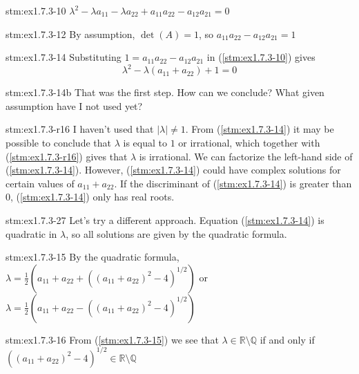 \begin{statement}{stm:ex1.7.3-10}
$\lambda^2 - \lambda a_{11} - \lambda a_{22} + a_{11}a_{22} - a_{12}a_{21} = 0$
\end{statement}

\begin{statement}{stm:ex1.7.3-12}
By assumption, $\det(A) = 1$, so $a_{11}a_{22} - a_{12}a_{21} = 1$
\end{statement}

\begin{statement}{stm:ex1.7.3-14}
Substituting $1 = a_{11}a_{22} - a_{12}a_{21}$ in (\ref{stm:ex1.7.3-10}) gives
$$\lambda^2 - \lambda(a_{11} + a_{22}) + 1 = 0$$
\end{statement}

\begin{explanation}{stm:ex1.7.3-14b}
That was the first step. How can we conclude? What given assumption have I not used yet?
\end{explanation}

\begin{explanation}{stm:ex1.7.3-r16}
I haven't used that $|\lambda| \ne 1$. From (\ref{stm:ex1.7.3-14}) it may be possible to conclude that $\lambda$ is equal to $1$ or irrational, which together with (\ref{stm:ex1.7.3-r16}) gives that $\lambda$ is irrational. We can factorize the left-hand side of (\ref{stm:ex1.7.3-14}). However, (\ref{stm:ex1.7.3-14}) could have complex solutions for certain values of $a_{11} + a_{22}$. If the discriminant of (\ref{stm:ex1.7.3-14}) is greater than $0$, (\ref{stm:ex1.7.3-14}) only has real roots. 
\end{explanation}

\begin{explanation}{stm:ex1.7.3-27}
Let's try a different approach. Equation (\ref{stm:ex1.7.3-14}) is quadratic in $\lambda$, so all solutions are given by the quadratic formula.
\end{explanation}

\begin{statement}{stm:ex1.7.3-15}
By the quadratic formula, $\lambda = \frac{1}{2}(a_{11} + a_{22} + ((a_{11} + a_{22})^2 - 4)^{1/2})$ or $\lambda = \frac{1}{2}(a_{11} + a_{22} - ((a_{11} + a_{22})^2 - 4)^{1/2})$
\end{statement}

\begin{statement}{stm:ex1.7.3-16}
From (\ref{stm:ex1.7.3-15}) we see that $\lambda \in \mathbb{R} \setminus \mathbb{Q}$ if and only if $((a_{11} + a_{22})^2 - 4)^{1/2} \in \mathbb{R} \setminus \mathbb{Q}$
\end{statement}

